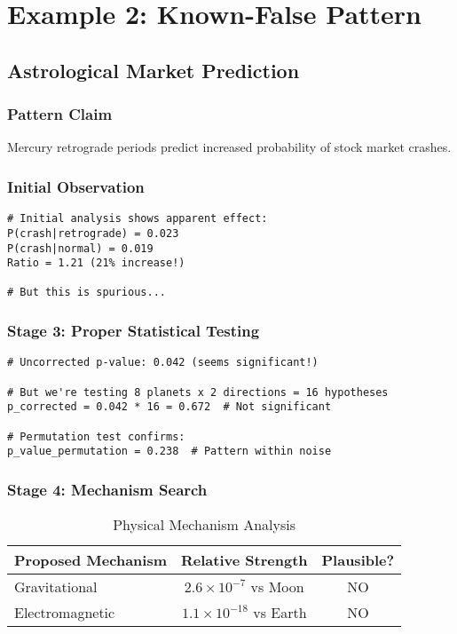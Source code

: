 \documentclass[12pt,oneside]{memoir}
\theoremstyle{plain}
\theoremstyle{definition}
\theoremstyle{remark}
\begin{document}
\chapter{Example 2: Known-False Pattern}
\section{Astrological Market Prediction}

\subsection{Pattern Claim}
Mercury retrograde periods predict increased probability of stock market crashes.

\subsection{Initial Observation}
\begin{lstlisting}[caption={Spurious Correlation}]
# Initial analysis shows apparent effect:
P(crash|retrograde) = 0.023
P(crash|normal) = 0.019
Ratio = 1.21 (21% increase!)

# But this is spurious...
\end{lstlisting}

\subsection{Stage 3: Proper Statistical Testing}

\begin{lstlisting}[caption={Multiple Testing Correction}]
# Uncorrected p-value: 0.042 (seems significant!)

# But we're testing 8 planets x 2 directions = 16 hypotheses
p_corrected = 0.042 * 16 = 0.672  # Not significant

# Permutation test confirms:
p_value_permutation = 0.238  # Pattern within noise
\end{lstlisting}

\subsection{Stage 4: Mechanism Search}

\begin{table}[h]
\centering
\caption{Physical Mechanism Analysis}
\begin{tabular}{lcc}
\toprule
\textbf{Proposed Mechanism} & \textbf{Relative Strength} & \textbf{Plausible?} \\
\midrule
Gravitational & $2.6 \times 10^{-7}$ vs Moon & \textcolor{failcolor}{NO} \\
Electromagnetic & $1.1 \times 10^{-18}$ vs Earth & \textcolor{failcolor}{NO} \\
\bottomrule
\end{tabular}
\end{table}
\end{document}
